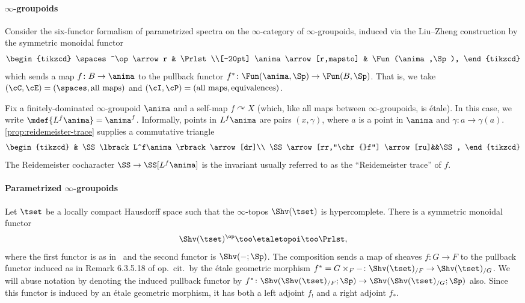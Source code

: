 \paragraph{$\infty$-groupoids}
Consider the six-functor formalism of parametrized spectra on the $\infty$-category of $\infty$-groupoids, induced via the Liu--Zheng construction by the symmetric monoidal functor
\[
  \begin{tikzcd}
    \spaces^\op\arrow r & \Prlst\\[-20pt]
    \anima\arrow[r,mapsto] & \Fun (\anima ,\Sp ),
  \end{tikzcd}
\]
which sends a map $f\colon B\to\anima$ to the pullback functor $f^*\colon\Fun (\anima ,\Sp )\to\Fun (B,\Sp )$. That is, we take $(\cC ,\cE ) = (\spaces ,\textrm{all maps})$ and $(\cI ,\cP ) = (\textrm{all maps}, \textrm{equivalences})$.

Fix a finitely-dominated $\infty$-groupoid $\anima$ and a self-map $f\curvearrowright X$ (which, like all maps between $\infty$-groupoids, is \'etale). In this case, we write $\mdef{L^f\anima } = \anima^f$. Informally, points in $L^f\anima$ are pairs $(x,\gamma )$, where $a$ is a point in $\anima$ and $\gamma\colon a\to\gamma (a)$. \cref{prop:reidemeister-trace} supplies a commutative triangle
  \begin{equation}
    \label{eq:homotopical-lefschetz-trace}
    \begin{tikzcd}
      & \SS\lbrack L^f\anima\rbrack\arrow[dr]\\
      \SS\arrow[rr,"\chr {}f"] \arrow[ru]&&\SS,
    \end{tikzcd}
  \end{equation}
  The Reidemeister cocharacter $\SS\to\SS\lbrack L^f\anima\rbrack$ is the invariant usually referred to as the ``Reidemeister trace'' of $f$.
\paragraph{Parametrized $\infty$-groupoids}
  Let $\tset$ be a locally compact Hausdorff space such that the $\infty$-topos $\Shv (\tset )$ is hypercomplete. There is a symmetric monoidal functor
  \[
    \Shv (\tset )^\op\too\etaletopoi\too\Prlst,
  \]
  where the first functor is as in~\cite[Rem~6.3.5.10]{Lurie2009} and the second functor is $\Shv ({-};\Sp )$. The composition sends a map of sheaves $f\colon G\to F$ to the pullback functor induced as in Remark 6.3.5.18 of op.~cit.~by the \'etale geometric morphism $f^*=G\times_F{-}\colon\Shv (\tset )_{/F}\to\Shv (\tset )_{/G}$. We will abuse notation by denoting the induced pullback functor by $f^*\colon\Shv (\Shv (\tset )_{/F};\Sp)\to\Shv (\Shv (\tset )_{/G};\Sp )$ also. Since this functor is induced by an \'etale geometric morphism, it has both a left adjoint $f_!$ and a right adjoint $f_*$. 
  
